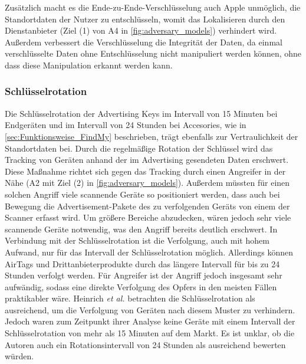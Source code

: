 Zusätzlich macht es die Ende-zu-Ende-Verschlüsselung auch Apple unmöglich, die Standortdaten der Nutzer zu entschlüsseln, womit das Lokalisieren durch den Dienstanbieter (Ziel (1) von A4 in \autoref{fig:adversary_models}) verhindert wird.
Außerdem verbessert die Verschlüsselung die Integrität der Daten, da einmal verschlüsselte Daten ohne Entschlüsselung nicht manipuliert werden können, ohne dass diese Manipulation erkannt werden kann.


\subsubsection{Schlüsselrotation}
Die Schlüsselrotation der Advertising Keys im Intervall von 15 Minuten bei Endgeräten und im Intervall von 24 Stunden bei Accesories, wie in \autoref{sec:Funktionsweise_FindMy} beschrieben, trägt ebenfalls zur Vertraulichkeit der Standortdaten bei.
Durch die regelmäßige Rotation der Schlüssel wird das Tracking von Geräten anhand der im Advertising gesendeten Daten erschwert.
Diese Maßnahme richtet sich gegen das Tracking durch einen Angreifer in der Nähe (A2 mit Ziel (2) in \autoref{fig:adversary_models}).
Außerdem müssten für einen solchen Angriff viele scannende Geräte so positioniert werden, dass auch bei Bewegung die Advertisement-Pakete des zu verfolgenden Geräts von einem der Scanner erfasst wird.
Um größere Bereiche abzudecken, wären jedoch sehr viele scannende Geräte notwendig, was den Angriff bereits deutlich erschwert.
In Verbindung mit der Schlüsselrotation ist die Verfolgung, auch mit hohem Aufwand, nur für das Intervall der Schlüsselrotation möglich.
Allerdings können AirTags und Drittanbieterprodukte durch das längere Intervall für bis zu 24 Stunden verfolgt werden.
Für Angreifer ist der Angriff jedoch insgesamt sehr aufwändig, sodass eine direkte Verfolgung des Opfers in den meisten Fällen praktikabler wäre.
Heinrich \textit{et al.} \cite{Heinrich_FindMy} betrachten die Schlüsselrotation als ausreichend, um die Verfolgung von Geräten nach diesem Muster zu verhindern.
Jedoch waren zum Zeitpunkt ihrer Analyse keine Geräte mit einem Intervall der Schlüsselrotation von mehr als 15 Minuten auf dem Markt.
Es ist unklar, ob die Autoren auch ein Rotationsintervall von 24 Stunden als ausreichend bewerten würden.